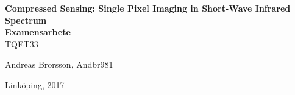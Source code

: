 	 



\begin{titlepage}
		\begin{center}
			
			{\LARGE\bfseries Compressed Sensing: Single Pixel Imaging in Short-Wave Infrared Spectrum \\[0.4in] \Large Examensarbete}\\ \medskip TQET33 \medskip  \\ 
			\vspace{2\baselineskip}
			
			Andreas Brorsson, Andbr981\\
			
			\vspace{2\baselineskip}
			
			Linköping, 2017
			
		\end{center}
\end{titlepage}		


\begin{flushleft}

% 
% 
% 
%
\newpage

\newpage

\newpage

\newpage

\newpage

\newpage

\newpage

\end{flushleft}


\newpage
\printbibliography


